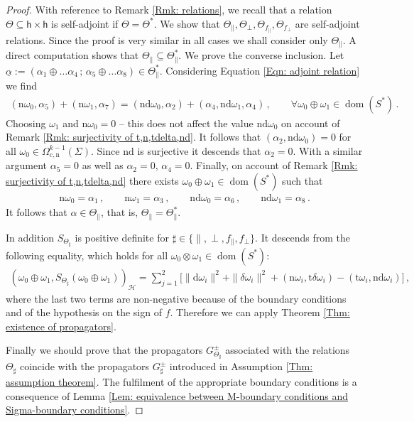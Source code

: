 \begin{proof}
	With reference to Remark \ref{Rmk: relations}, we recall that a relation $\Theta\subseteq\mathsf{h}\times\mathsf{h}$ is self-adjoint if $\Theta=\Theta^*$.
	We show that $\Theta_\parallel,\Theta_\perp,\Theta_{f_\parallel},\Theta_{f_\perp}$ are self-adjoint relations.
	Since the proof is very similar in all cases we shall consider only $\Theta_\parallel$.
	A direct computation shows that $\Theta_\parallel\subseteq\Theta_\parallel^*$. We prove the converse inclusion.
	Let $\underline{\alpha}:=(\alpha_1\oplus\ldots\alpha_4\,;\,\alpha_5\oplus\ldots\alpha_8)\in\Theta_\parallel^*$.
	Considering Equation \eqref{Eqn: adjoint relation} we find
	\begin{align}
	(\mathrm{n}\omega_0,\alpha_5)+
	(\mathrm{n}\omega_1,\alpha_7)=
	(\mathrm{nd}\omega_0,\alpha_2)+
	(\alpha_4,\mathrm{nd}\omega_1,\alpha_4)\,,\qquad
	\forall\omega_0\oplus\omega_1\in \operatorname{dom}(S^*)\,.
	\end{align}
	Choosing $\omega_1$ and $\mathrm{n}\omega_0=0$ -- this does not affect the value $\mathrm{nd}\omega_0$ on account of Remark \ref{Rmk: surjectivity of t,n,tdelta,nd}. It follows that $(\alpha_2,\mathrm{nd}\omega_0)=0$ for all $\omega_0\in\Omega_{\mathrm{c,n}}^{k-1}(\Sigma)$.
	Since $\mathrm{nd}$ is surjective it descends that $\alpha_2=0$.
	With a similar argument $\alpha_5=0$ as well as $\alpha_2=0$, $\alpha_4=0$.
	Finally, on account of Remark \ref{Rmk: surjectivity of t,n,tdelta,nd} there exists $\omega_0\oplus\omega_1\in \operatorname{dom}(S^*)$ such that
	\begin{align*}
	\mathrm{n}\omega_0=\alpha_1\,,\qquad
	\mathrm{n}\omega_1=\alpha_3\,,\qquad
	\mathrm{nd}\omega_0=\alpha_6\,,\qquad
	\mathrm{nd}\omega_1=\alpha_8\,.
	\end{align*}
	It follows that $\alpha\in\Theta_\parallel$, that is, $\Theta_\parallel=\Theta_\parallel^*$.
	
	In addition $S_{\Theta_\sharp}$ is positive definite for $\sharp\in\lbrace\parallel,\perp,f_\parallel,f_\perp\rbrace$. It descends from the following equality, which holds for all $\omega_0\otimes\omega_1\in \operatorname{dom}(S^*)$:
	\begin{align*}
	(\omega_0\oplus\omega_1,S_{\Theta_\sharp}(\omega_0\oplus\omega_1))_{\mathcal{H}}=
	\sum_{j=1}^2\big[
	\|\mathrm{d}\omega_i\|^2+
	\|\delta\omega_i\|^2+
	(\mathrm{n}\omega_i,\mathrm{t}\delta\omega_i)-
	(\mathrm{t}\omega_i,\mathrm{nd}\omega_i)
	\big]\,,
	\end{align*}
	where the last two terms are non-negative because of the boundary conditions and of the hypothesis on the sign of $f$.
	Therefore we can apply Theorem \ref{Thm: existence of propagators}.
	
	Finally we should prove that the propagators $G^\pm_{\Theta_\sharp}$ associated with the relations $\Theta_\sharp$ coincide with the propagators $G^\pm_\sharp$ introduced in Assumption \ref{Thm: assumption theorem}.
	The fulfilment of the appropriate boundary conditions is a consequence of Lemma \ref{Lem: equivalence between M-boundary conditions and Sigma-boundary conditions}.
\end{proof}

